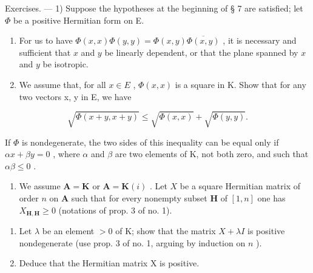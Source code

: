 Exercises. --- 1) Suppose the hypotheses at the beginning of § 7 are satisfied; let \(\Phi\) be a positive Hermitian form on E.

\begin{enumerate}
\def\labelenumi{\alph{enumi})}
\item
  For us to have \(\Phi(x,x)\Phi(y,y)=\Phi(x,y)\overline{\Phi(x,y)}\) , it is necessary and sufficient that \(x\) and \(y\) be linearly dependent, or that the plane spanned by \(x\) and \(y\) be isotropic.
\item
  We assume that, for all \(x \in E\) , \(\Phi(x, x)\) is a square in K. Show that for any two vectors x, y in E, we have
\end{enumerate}

\[
\sqrt {\Phi (x + y , x + y)} \leqslant \sqrt {\Phi (x , x)} + \sqrt {\Phi (y , y)}.
\]

If \(\Phi\) is nondegenerate, the two sides of this inequality can be equal only if \(\alpha x + \beta y = 0\) , where \(\alpha\) and \(\beta\) are two elements of K, not both zero, and such that \(\alpha \beta \leqslant 0\) .

\begin{enumerate}
\def\labelenumi{\arabic{enumi})}
\setcounter{enumi}{1}
\tightlist
\item
  We assume \(\mathbf{A} = \mathbf{K}\) or \(\mathbf{A} = \mathbf{K}(i)\) . Let \(X\) be a square Hermitian matrix of order \(n\) on \(\mathbf{A}\) such that for every nonempty subset \(\mathbf{H}\) of \([1, n]\) one has \(X_{\mathbf{H},\mathbf{H}} \geqslant 0\) (notations of prop. 3 of no. 1).
\end{enumerate}

\begin{enumerate}
\def\labelenumi{\alph{enumi})}
\item
  Let \(\lambda\) be an element \(>0\) of K; show that the matrix \(X + \lambda I\) is positive nondegenerate (use prop. 3 of no. 1, arguing by induction on \(n\) ).
\item
  Deduce that the Hermitian matrix X is positive.
\end{enumerate}

